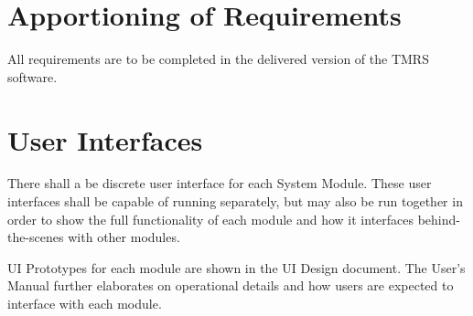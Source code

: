 \documentclass{scrreprt}
\begin{document}
\section{Apportioning of Requirements}
All requirements are to be completed in the delivered version of the TMRS software.


\section{User Interfaces}
There shall a be discrete user interface for each System Module. These user
interfaces shall be capable of running separately, but may also be run together
in order to show the full functionality of each module and how it interfaces
behind-the-scenes with other modules.

UI Prototypes for each module are shown in the UI Design document. The User's
Manual further elaborates on operational details and how users are expected to
interface with each module.


%


\end{document}
